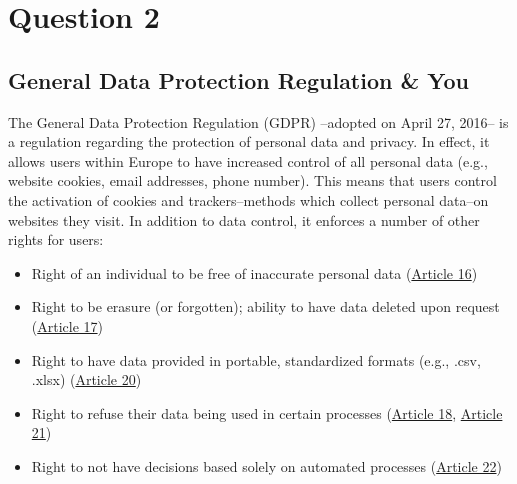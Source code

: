 \documentclass[
	letterpaper, %
]{jdf}
\begin{document}
\section{Question 2}
\subsection{General Data Protection Regulation \& You}
The General Data Protection Regulation (GDPR) --adopted on April 27, 2016-- is a regulation regarding the protection of personal data and privacy. In effect, it allows users within Europe to have increased control of all personal data (e.g., website cookies, email addresses, phone number). This means that users control the activation of cookies and trackers--methods which collect personal data--on websites they visit. In addition to data control, it enforces a number of other rights for users:
\begin{itemize}
	\item Right of an individual to be free of inaccurate personal data (\href{https://gdpr-info.eu/art-16-gdpr/}{Article 16})
	\item Right to be erasure (or forgotten); ability to have data deleted upon request (\href{https://gdpr-info.eu/art-17-gdpr/}{Article 17})
	\item Right to have data provided in portable, standardized formats (e.g., .csv, .xlsx) (\href{https://gdpr-info.eu/art-20-gdpr/}{Article 20})
	\item Right to refuse their data being used in certain processes (\href{https://gdpr-info.eu/art-18-gdpr/}{Article 18}, \href{https://gdpr-info.eu/art-21-gdpr/}{Article 21})
	\item Right to not have decisions based solely on automated processes (\href{https://gdpr-info.eu/art-22-gdpr/}{Article 22})
\end{itemize}
\end{document}
